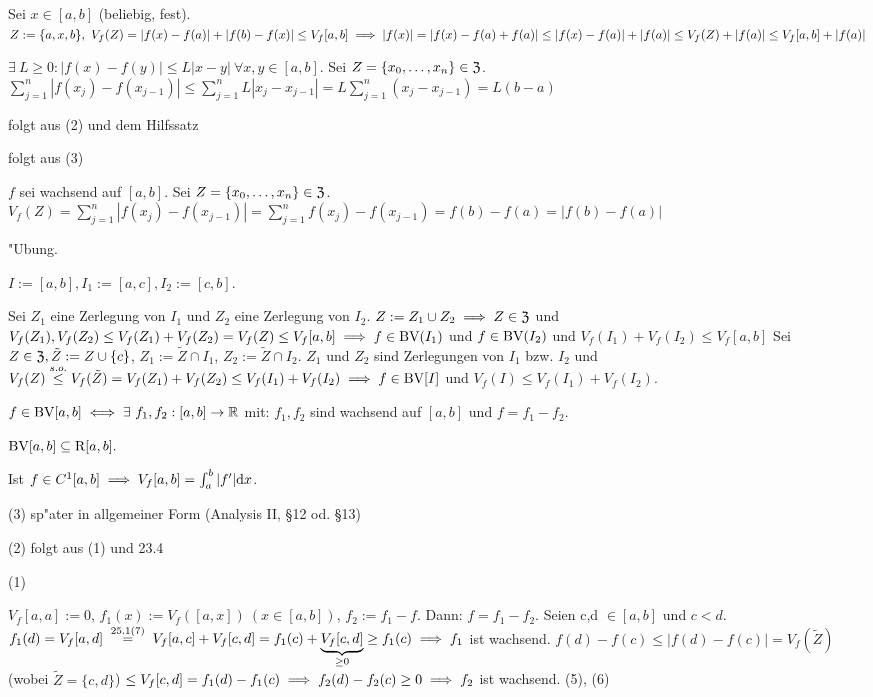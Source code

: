 \documentclass[a4paper,twoside,DIV15,BCOR12mm]{scrbook}
\begin{document}
\begin{beweise}
\item Sei $x\in [a,b]$ (beliebig, fest). $Z:=\{a,x,b\},\ V_f(Z)=|f(x)-f(a)|+|f(b)-f(x)|\le V_f[a,b]\folgt|f(x)|=|f(x)-f(a)+f(a)|\le |f(x)-f(a)|+|f(a)|\le V_f(Z)+|f(a)|\le V_f[a,b]+|f(a)|$
\item $\exists\ L \ge 0:|f(x)-f(y)|\le L|x-y|\ \forall x,y\in[a,b]$. Sei $Z=\{x_0,\ldots,x_n\}\in\mathfrak{Z}$. $\sum^n_{j=1}|f(x_j)-f(x_{j-1})|\le\sum^n_{j=1}L|x_j-x_{j-1}|=L\sum^n_{j=1}(x_j-x_{j-1})=L(b-a)$
\item folgt aus (2) und dem Hilfssatz
\item folgt aus (3)
\item $f$ sei wachsend auf $[a,b]$. Sei $Z=\{x_0,\ldots,x_n\}\in\mathfrak{Z}$. $V_f(Z)=\sum^n_{j=1}|f(x_j)-f(x_{j-1})|=\sum^n_{j=1}f(x_j)-f(x_{j-1})=f(b)-f(a)=|f(b)-f(a)|$
\item "Ubung.
\item $I:=[a,b],I_1:=[a,c],I_2:=[c,b]$.
\begin{description}
\hin Sei $Z_1$ eine Zerlegung von $I_1$ und $Z_2$ eine Zerlegung von $I_2$. $Z:=Z_1 \cup Z_2\implies Z\in\mathfrak{Z}$ und $V_f(Z_1),V_f(Z_2)\le V_f(Z_1)+V_f(Z_2)=V_f(Z)\le V_f[a,b]\implies f\in\text{BV}(I_1)$ und $f\in\text{BV}(I_2)$ und $V_f(I_1)+V_f(I_2)\le V_f[a,b]$
\zurueck Sei $Z \in\mathfrak{Z},\tilde{Z}:=Z\cup\{c\}$, $Z_1:=\tilde{Z}\cap I_1$, $Z_2:=\tilde{Z}\cap I_2$. $Z_1$ und $Z_2$ sind Zerlegungen von $I_1$ bzw. $I_2$ und $V_f(Z)\overset{s.o.}{\le}V_f(\tilde{Z})=V_f(Z_1)+V_f(Z_2)\le V_f(I_1)+V_f(I_2)\implies f\in\text{BV}[I]$ und $V_f(I)\le V_f(I_1)+V_f(I_2)$.
\end{description}
\end{beweise}

\begin{satz}
\begin{liste}
\item $f\in\BV[a,b]\equizu\exists\ f_1,f_2:[a,b]\to\MdR$ mit: $f_1,f_2$ sind wachsend auf $[a,b]$ und $f=f_1-f_2$.
\item $\text{BV}[a,b]\subseteq \text{R}[a,b].$
\item Ist $f\in C^1[a,b]\implies V_f[a,b]=\int_a^b|f'|\text{d}x$.
\end{liste}
\end{satz}

\begin{beweise}
\item[(3)] sp"ater in allgemeiner Form (Analysis II, §12 od. §13)
\item[(2)] folgt aus (1) und 23.4
\item[(1)]
\begin{description}
\hin $V_f[a,a]:=0$, $f_1(x):=V_f([a,x])\ (x\in[a,b])$, $f_2:=f_1-f$. Dann: $f=f_1-f_2$. Seien c,d $\in [a,b]$ und $c<d$. $f_1(d)=V_f[a,d]\gleichnach{25.1(7)}V_f[a,c]+V_f[c,d]=f_1(c)+\underbrace{V_f[c,d]}_{\ge 0}\ge f_1(c)\folgt f_1$ ist wachsend. $f(d)-f(c)\le|f(d)-f(c)|=V_f(\tilde{Z})$ (wobei $\tilde{Z}=\{c,d\}$) $\le V_f[c,d]=f_1(d)-f_1(c)\implies f_2(d)-f_2(c)\ge 0 \implies f_2$ ist wachsend.
(5), (6)
\end{description}
\end{beweise}
\end{document}
